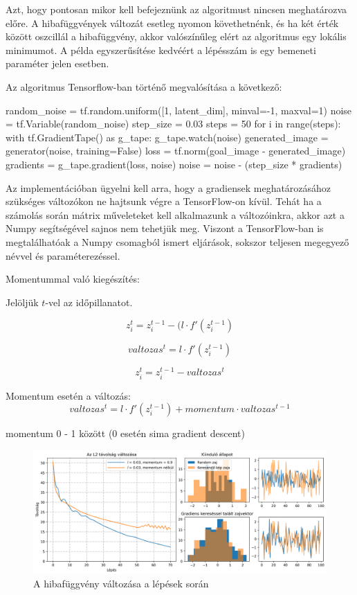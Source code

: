 Azt, hogy pontosan mikor kell befejeznünk az algoritmust nincsen meghatározva előre. A hibafüggvények változát esetleg nyomon követhetnénk, és ha két érték között oszcillál a hibafüggvény, akkor valószínűleg elért az algoritmus egy lokális minimumot. A példa egyszerűsítése kedvéért a lépésszám is egy bemeneti paraméter jelen esetben.

Az algoritmus Tensorflow-ban történő megvalósítása a következő:

\begin{python}
random_noise = tf.random.uniform([1, latent_dim], minval=-1, maxval=1)
noise = tf.Variable(random_noise)
step_size = 0.03
steps = 50
for i in range(steps):
    with tf.GradientTape() as g_tape:
        g_tape.watch(noise)
        generated_image = generator(noise, training=False)
        loss = tf.norm(goal_image - generated_image)
    gradients = g_tape.gradient(loss, noise)
    noise = noise - (step_size * gradients)
\end{python}

Az implementációban ügyelni kell arra, hogy a gradiensek meghatározásához szükséges változókon ne hajtsunk végre a TensorFlow-on kívül. Tehát ha a számolás során mátrix műveleteket kell alkalmazunk a változóinkra, akkor azt a Numpy segítségével sajnos nem tehetjük meg. Viszont a TensorFlow-ban is megtalálhatóak a Numpy csomagból ismert eljárások, sokszor teljesen megegyező névvel és paraméterezéssel.

Momentummal való kiegészítés:

Jelöljük $t$-vel az időpillanatot.

$$ z_i^t = z_i^{t-1} - (l \cdot f'(z_i^{t-1})$$

$$ valtozas^t = l \cdot f'(z_i^{t-1}) $$

$$ z_i^t = z_i^{t-1} - valtozas^t $$


Momentum esetén a változás:
$$ valtozas^t = l \cdot f'(z_i^{t-1}) + momentum \cdot valtozas^{t-1}$$


momentum 0 - 1 között (0 esetén sima gradient descent)


\begin{figure}[h]
\centering
\includegraphics[width=15cm]{images/grad_losses.png}
\caption{A hibafüggvény változása a lépések során}
\label{fig:gradlosses}
\end{figure}


